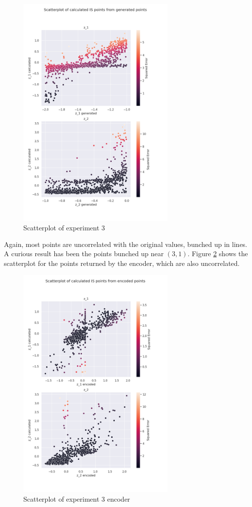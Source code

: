 \begin{figure}[H]
    \centering
    \includegraphics[width=0.7\textwidth]{Cap5/scatterplot3}
    \caption{Scatterplot of experiment 3}
    \label{fig:scatter_exp3}
\end{figure}

Again, most points are uncorrelated with the original values, bunched up in lines. A curious result has been the points bunched up near $(3, 1)$. Figure \ref{fig:scatter_enc_exp3} shows the scatterplot for the points returned by the encoder, which are also uncorrelated.

\begin{figure}[H]
    \centering
    \includegraphics[width=0.7\textwidth]{Cap5/scatterplot_enc3}
    \caption{Scatterplot of experiment 3 encoder}
    \label{fig:scatter_enc_exp3}
\end{figure}